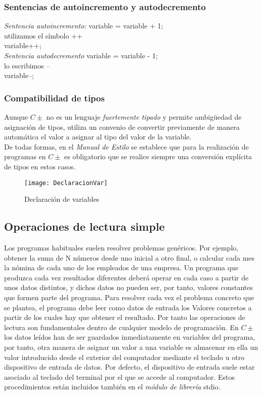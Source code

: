 \documentclass[11pt,a4paper]{article}
\begin{document}
 \subsubsection{Sentencias de autoincremento y autodecremento}
  \textit{Sentencia autoincremento:} variable = variable + 1;\\
  utilizamos el símbolo ++\\
  variable++;\\
  \textit{Sentencia autodecremento} variable = variable - 1;\\
  lo escribimos --\\
  variable--;
  \subsubsection{Compatibilidad de tipos}
  Aunque $C\pm$ no es un lenguaje \textit{fuertemente tipado} y permite ambigüedad de asignación de tipos, utiliza un convenio de convertir previamente de manera automática el valor a asignar al tipo del valor de la variable.\\ De todas formas, en el \textit{Manual de Estilo} se establece que para la realización de programas en $C\pm$ es obligatorio que se realice siempre una conversión explícita de tipos en estos casos.
   \begin{figure}[htb]
  	\centering
  	\texttt{[image: DeclaracionVar]}
  	\caption{Declaración de variables}
  	\label{fig:Declaración variable}
  \end{figure} 
  
 \subsection{Operaciones de lectura simple}  
 Los programas habituales suelen resolver problemas genéricos. Por ejemplo, obtener la suma de N números desde uno inicial a otro final, o calcular cada 
 mes la nómina de cada uno de los empleados de una empresa. Un programa
 que produzca cada vez resultados diferentes deberá operar en cada caso a 
 partir de unos datos distintos, y dichos datos no pueden ser, por tanto, valores 
 constantes que formen parte del programa. Para resolver cada vez el problema concreto que se plantea, el programa debe 
 leer como datos de entrada los Valores concretos a partir de los cuales hay 
 que obtener el resultado. Por tanto las operaciones de lectura son fundamentales dentro de cualquier modelo de programación. En $C\pm$ los datos leídos han de ser guardados inmediatamente en variables del programa, por tanto, otra manera de asignar un valor a una variable 
 es almacenar en ella un valor introducido desde el exterior del computador 
 mediante el teclado u otro dispositivo de entrada de datos.
 Por defecto, el dispositivo de entrada 
 suele estar asociado al teclado del terminal por el que se accede al computador. 
 Estos procedimientos están incluidos también en el \textit{módulo de librería} stdio.
\end{document}
